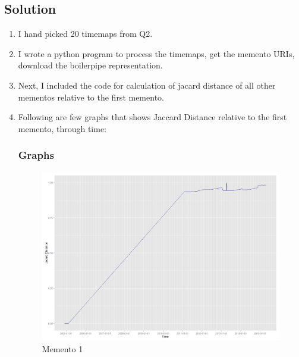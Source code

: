 \subsection{Solution}
\begin{enumerate}

\item I hand picked 20 timemaps from Q2.

\item I wrote a python program to process the timemaps, get the memento URIs, download the boilerpipe representation.

\item Next, I included the code for calculation of jacard distance of all other mementos relative to the first memento.

\item Following are few graphs that shows Jaccard Distance relative to the first memento, through time:


\newpage
\subsubsection{Graphs}
\begin{figure}[ht]    
    \begin{center}
        \includegraphics[scale=0.40]{graphs/3_j1.png}
        \caption{Memento 1}
    \end{center}
\end{figure}


\end{enumerate}
